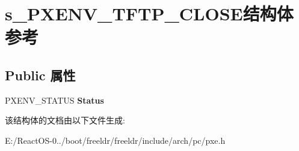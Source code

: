\hypertarget{structs___p_x_e_n_v___t_f_t_p___c_l_o_s_e}{}\section{s\+\_\+\+P\+X\+E\+N\+V\+\_\+\+T\+F\+T\+P\+\_\+\+C\+L\+O\+S\+E结构体 参考}
\label{structs___p_x_e_n_v___t_f_t_p___c_l_o_s_e}
\subsection*{Public 属性}
\begin{DoxyCompactItemize}
\item 
\mbox{\label{structs___p_x_e_n_v___t_f_t_p___c_l_o_s_e_a7fdbd7455d12be3f2f9b9ef2538878f1}} 
P\+X\+E\+N\+V\+\_\+\+S\+T\+A\+T\+US {\bfseries Status}
\end{DoxyCompactItemize}


该结构体的文档由以下文件生成\+:\begin{DoxyCompactItemize}
\item 
E\+:/\+React\+O\+S-\/0../boot/freeldr/freeldr/include/arch/pc/pxe.\+h\end{DoxyCompactItemize}
